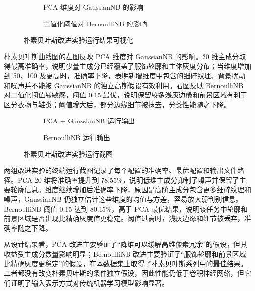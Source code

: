 \documentclass[UTF8]{ctexart}
\begin{document}
\begin{figure}[H]
\centering
\begin{subfigure}{0.48\textwidth}
  \centering
  \caption{PCA 维度对 GaussianNB 的影响}
\end{subfigure}
\begin{subfigure}{0.48\textwidth}
  \centering
  \caption{二值化阈值对 BernoulliNB 的影响}
\end{subfigure}
\caption{朴素贝叶斯改进实验运行结果可视化}
\end{figure}

朴素贝叶斯曲线图的左图反映 PCA 维度对 GaussianNB 的影响。20 维主成分取得最高准确率，说明少量主成分已经覆盖了服饰轮廓和主体灰度分布；当维度增加到 50、100 及更高时，准确率下降，表明新增维度中包含的细碎纹理、背景扰动和噪声并不能被 GaussianNB 的独立高斯假设有效利用。右图反映 BernoulliNB 对二值化阈值较敏感，阈值 0.15 最优，说明保留较多浅灰边缘和前景区域有利于区分衣物与鞋类；阈值增大后，部分边缘细节被抹去，分类性能随之下降。

\begin{figure}[H]
\centering
\begin{subfigure}{0.48\textwidth}
  \centering
  \caption{PCA + GaussianNB 运行输出}
\end{subfigure}
\begin{subfigure}{0.48\textwidth}
  \centering
  \caption{BernoulliNB 运行输出}
\end{subfigure}
\caption{朴素贝叶斯改进实验运行截图}
\end{figure}

两组改进实验的终端运行截图记录了每个配置的准确率、最优配置和输出文件路径。PCA 20 维将准确率提升到 78.55\%，说明低维主成分抑制了噪声并保留了主要轮廓信息。维度继续增加后准确率下降，原因是高阶主成分包含更多细碎纹理和噪声，GaussianNB 仍独立估计这些维度的均值与方差，容易放大弱判别信息。BernoulliNB 阈值 0.15 达到 80.15\%，高于 PCA 最优结果，说明该任务中轮廓和前景区域是否出现比精确灰度值更稳定。阈值过高时，浅灰边缘和细节被丢弃，准确率随之下降。

从设计结果看，PCA 改进主要验证了“降维可以缓解高维像素冗余”的假设，但其收益受主成分数量影响明显；BernoulliNB 改进主要验证了“服饰轮廓和前景区域比精确灰度更稳定”的假设，在本数据集上取得了朴素贝叶斯系列中的最佳结果。二者都没有改变朴素贝叶斯的条件独立假设，因此性能仍低于卷积神经网络，但它们证明了输入表示方式对传统机器学习模型影响显著。
\end{document}
